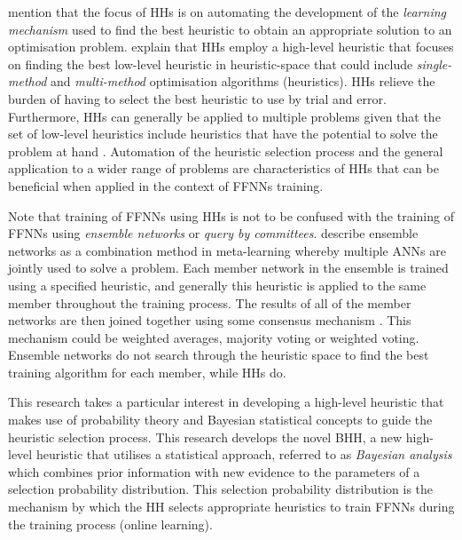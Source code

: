 \citeauthor{ref:grobler:2012} \cite{ref:grobler:2012} mention that the focus of
\acp{HH} is on automating the development of the \textit{learning mechanism}
used to find the best heuristic to obtain an appropriate solution to an optimisation problem. \citeauthor{ref:grobler:2012} explain that \acp{HH} employ a high-level heuristic that focuses on
finding the best low-level heuristic in heuristic-space that could include
\textit{single-method} and \textit{multi-method} optimisation algorithms
(heuristics). \acp{HH} relieve the burden of having to select the best
heuristic to use by trial and error. Furthermore, \acp{HH} can generally be applied to multiple
problems given that the set of low-level heuristics include
heuristics that have the potential to solve the problem at hand
\cite{ref:burke:2010}. Automation of the heuristic selection process and the general application to a wider range of problems are characteristics of \acp{HH} that can be beneficial when applied in the context of \acp{FFNN} training.

Note that training of \acp{FFNN} using \acp{HH} is not to be confused with the
training of \acp{FFNN} using \textit{ensemble networks}
or \textit{query by committees}.
\citeauthor{ref:pappa:2014} \cite{ref:pappa:2014} describe ensemble networks as a combination method in
meta-learning whereby multiple \acp{ANN} are jointly used
to solve a problem. Each member network in the ensemble is trained using a
specified heuristic, and generally this heuristic is applied to the same member
throughout the training process. The results of all of the member networks are
then joined together using some consensus mechanism \cite{ref:zhou:2002}. This mechanism
could be weighted averages, majority voting or weighted voting. Ensemble networks do not search through the heuristic space to find the best training algorithm for each member, while \acp{HH} do.




This research takes a particular interest in developing a high-level heuristic
that makes use of probability theory and Bayesian statistical concepts to guide
the heuristic selection process. This research develops the novel \Acf{BHH}, a
new high-level heuristic that utilises a statistical approach, referred to as \textit{Bayesian
      analysis} which combines prior information with new evidence to the parameters of a selection probability distribution. This selection probability distribution is the mechanism by which the \ac{HH} selects appropriate
heuristics to train \acp{FFNN} during the training process (online learning).


